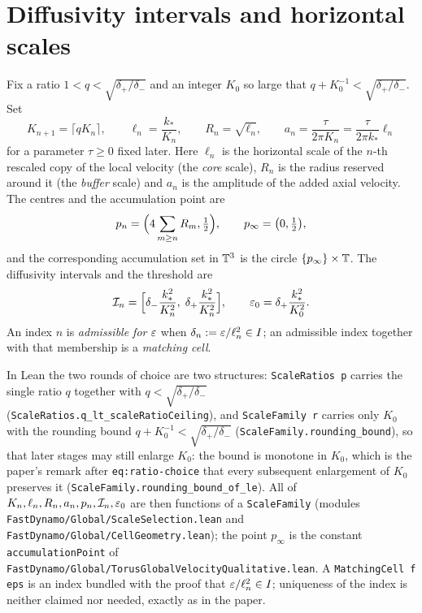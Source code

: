 \section{Diffusivity intervals and horizontal scales}

\begin{definition}
  \label{def:velocity:scale-family}
  \leanok
  Fix a ratio $1<q<\sqrt{\delta_+/\delta_-} $ and an integer $K_0 $ so large that
  $q+K_0^{-1}<\sqrt{\delta_+/\delta_-} $.  Set
  \[
    K_{n+1}=\lceil qK_n\rceil,
    \qquad
    \ell_n=\frac{k_*}{K_n},
    \qquad
    R_n=\sqrt{\ell_n},
    \qquad
    a_n=\frac{\tau}{2\pi K_n}=\frac{\tau}{2\pi k_*}\ell_n
  \]
  for a parameter $\tau\geq0 $ fixed later.  Here $\ell_n $ is the horizontal scale of the
  $n $-th rescaled copy of the local velocity (the \emph{core} scale), $R_n $ is the radius
  reserved around it (the \emph{buffer} scale) and $a_n $ is the amplitude of the added
  axial velocity.  The centres and the accumulation point are
  \[
    p_n=\Bigl(4\sum_{m\geq n}R_m,\tfrac12\Bigr),
    \qquad
    p_\infty=\bigl(0,\tfrac12\bigr),
  \]
  and the corresponding accumulation set in $\mathbb{T}^3 $ is the circle $\{p_\infty\}\times\mathbb{T} $.
  The diffusivity intervals and the threshold are
  \[
    \mathcal{I}_n=\Bigl[\delta_-\frac{k_*^2}{K_n^2},\;\delta_+\frac{k_*^2}{K_n^2}\Bigr],
    \qquad
    \varepsilon_0=\delta_+\frac{k_*^2}{K_0^2}.
  \]
  An index $n $ is \emph{admissible for} $\varepsilon $ when $\delta_n:=\varepsilon/\ell_n^2\in I $; an
  admissible index together with that membership is a \emph{matching cell}.
\end{definition}

In Lean the two rounds of choice are two structures: \texttt{ScaleRatios p} carries the
single ratio $q $ together with $q<\sqrt{\delta_+/\delta_-} $
(\texttt{ScaleRatios.q\_lt\_scaleRatioCeiling}), and \texttt{ScaleFamily r} carries only
$K_0 $ with the rounding bound $q+K_0^{-1}<\sqrt{\delta_+/\delta_-} $
(\texttt{ScaleFamily.rounding\_bound}), so that later stages may still enlarge $K_0 $:
the bound is monotone in $K_0 $, which is the paper's remark after
\texttt{eq:ratio-choice} that every subsequent enlargement of $K_0 $ preserves it
(\texttt{ScaleFamily.rounding\_bound\_of\_le}).
All of $K_n,\ell_n,R_n,a_n,p_n,\mathcal{I}_n,\varepsilon_0 $ are then functions of a
\texttt{ScaleFamily} (modules \texttt{FastDynamo/Global/ScaleSelection.lean} and
\texttt{FastDynamo/Global/CellGeometry.lean}); the point $p_\infty $ is the constant
\texttt{accumulationPoint} of
\texttt{FastDynamo/Global/TorusGlobalVelocityQualitative.lean}.  A
\texttt{MatchingCell f eps} is an index bundled with the proof that
$\varepsilon/\ell_n^2\in I $; uniqueness of the index is neither claimed nor needed, exactly as
in the paper.

